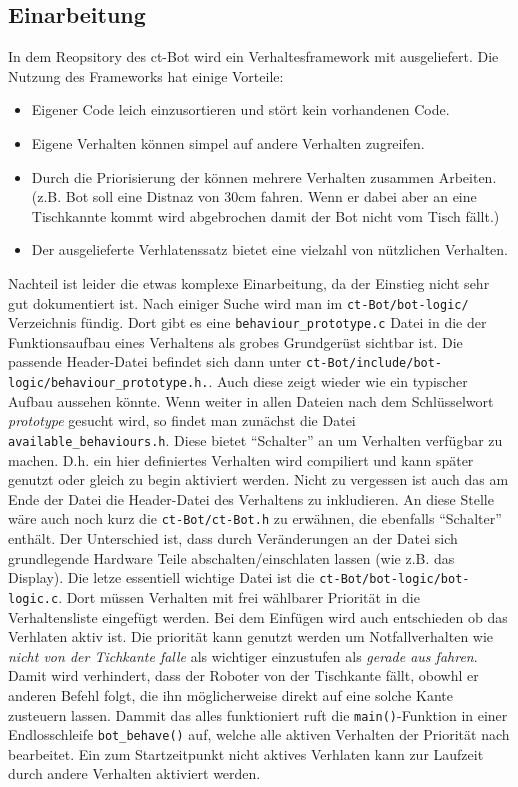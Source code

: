 \subsection{Einarbeitung}
\label{einarbeitung}
In dem Reopsitory des ct-Bot wird ein Verhaltesframework mit ausgeliefert.
Die Nutzung des Frameworks hat einige Vorteile:
\begin{itemize}
	\item Eigener Code leich einzusortieren und stört kein vorhandenen Code.
	\item Eigene Verhalten können simpel auf andere Verhalten zugreifen.
	\item Durch die Priorisierung der können mehrere Verhalten zusammen Arbeiten.
		(z.B. Bot soll eine Distnaz von 30cm fahren. Wenn er dabei aber an eine
		Tischkannte kommt wird abgebrochen damit der Bot nicht vom Tisch fällt.)
	\item Der ausgelieferte Verhlatenssatz bietet eine vielzahl von nützlichen
		Verhalten.
\end{itemize}
Nachteil ist leider die etwas komplexe Einarbeitung, da der Einstieg nicht sehr gut
dokumentiert ist. Nach einiger Suche wird man im \verb+ct-Bot/bot-logic/+ 
Verzeichnis fündig. Dort gibt es eine \verb+behaviour_prototype.c+ Datei
in die der Funktionsaufbau eines Verhaltens als grobes Grundgerüst sichtbar ist.
Die passende Header-Datei befindet sich dann unter
\verb+ct-Bot/include/bot-logic/behaviour_prototype.h.+. Auch diese
zeigt wieder wie ein typischer Aufbau aussehen könnte. Wenn weiter in allen Dateien
nach dem Schlüsselwort \textit{prototype} gesucht wird, so findet man zunächst
die Datei \\ \verb+available_behaviours.h+. Diese bietet "`Schalter"'
an um Verhalten verfügbar zu machen. D.h. ein hier definiertes Verhalten
wird compiliert und kann später genutzt oder gleich zu begin aktiviert werden.
Nicht zu vergessen ist auch das am Ende der Datei die Header-Datei des
Verhaltens zu inkludieren. An diese Stelle wäre auch noch kurz die
\verb+ct-Bot/ct-Bot.h+ zu erwähnen, die ebenfalls "`Schalter"' enthält.
Der Unterschied ist, dass durch Veränderungen an der Datei sich grundlegende
Hardware Teile abschalten/einschlaten lassen (wie z.B. das Display).
Die letze essentiell wichtige Datei ist die \verb+ct-Bot/bot-logic/bot-logic.c+.
Dort müssen Verhalten mit frei wählbarer Priorität in die Verhaltensliste
eingefügt werden. Bei dem Einfügen wird auch entschieden ob das Verhlaten
aktiv ist. Die priorität kann genutzt werden um Notfallverhalten wie
\textit{nicht von der Tichkante falle} als wichtiger einzustufen als
\textit{gerade aus fahren}. Damit wird verhindert, dass der Roboter von der
Tischkante fällt, obowhl er anderen Befehl folgt, die ihn möglicherweise
direkt auf eine solche Kante zusteuern lassen. Dammit das alles funktioniert
ruft die \verb+main()+-Funktion in einer Endlosschleife \verb+bot_behave()+ auf,
welche alle aktiven Verhalten der Priorität nach bearbeitet. Ein zum
Startzeitpunkt nicht aktives Verhlaten kann zur Laufzeit durch andere Verhalten
aktiviert werden.

